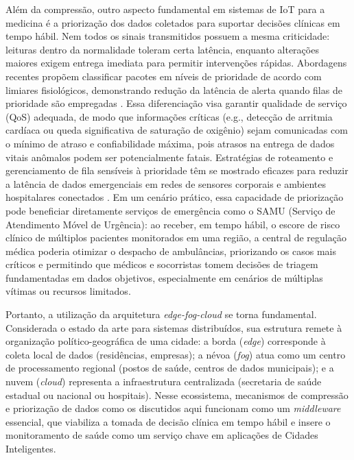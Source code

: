 \documentclass[twoside,english,brazilian]{UNISINOSmonografia}
\begin{document}
Além da compressão, outro aspecto fundamental em sistemas de IoT para a medicina é a priorização dos dados coletados para suportar decisões clínicas em tempo hábil. Nem todos os sinais transmitidos possuem a mesma criticidade: leituras dentro da normalidade toleram certa latência, enquanto alterações maiores exigem entrega imediata para permitir intervenções rápidas. Abordagens recentes propõem classificar pacotes em níveis de prioridade de acordo com limiares fisiológicos, demonstrando redução da latência de alerta quando filas de prioridade são empregadas \cite{DANG2025}. Essa diferenciação visa garantir qualidade de serviço (QoS) adequada, de modo que informações críticas (e.g., detecção de arritmia cardíaca ou queda significativa de saturação de oxigênio) sejam comunicadas com o mínimo de atraso e confiabilidade máxima, pois atrasos na entrega de dados vitais anômalos podem ser potencialmente fatais. Estratégias de roteamento e gerenciamento de fila sensíveis à prioridade têm se mostrado eficazes para reduzir a latência de dados emergenciais em redes de sensores corporais e ambientes hospitalares conectados \cite{Anwar2022}. Em um cenário prático, essa capacidade de priorização pode beneficiar diretamente serviços de emergência como o SAMU (Serviço de Atendimento Móvel de Urgência): ao receber, em tempo hábil, o escore de risco clínico de múltiplos pacientes monitorados em uma região, a central de regulação médica poderia otimizar o despacho de ambulâncias, priorizando os casos mais críticos e permitindo que médicos e socorristas tomem decisões de triagem fundamentadas em dados objetivos, especialmente em cenários de múltiplas vítimas ou recursos limitados. 

Portanto, a utilização da arquitetura \textit{edge-fog-cloud} se torna fundamental. Considerada o estado da arte para sistemas distribuídos, sua estrutura remete à organização político-geográfica de uma cidade: a borda (\textit{edge}) corresponde à coleta local de dados (residências, empresas); a névoa (\textit{fog}) atua como um centro de processamento regional (postos de saúde, centros de dados municipais); e a nuvem (\textit{cloud}) representa a infraestrutura centralizada (secretaria de saúde estadual ou nacional ou hospitais). Nesse ecossistema, mecanismos de compressão e priorização de dados como os discutidos aqui funcionam como um \textit{middleware} essencial, que viabiliza a tomada de decisão clínica em tempo hábil e insere o monitoramento de saúde como um serviço chave em aplicações de Cidades Inteligentes.
\end{document}
